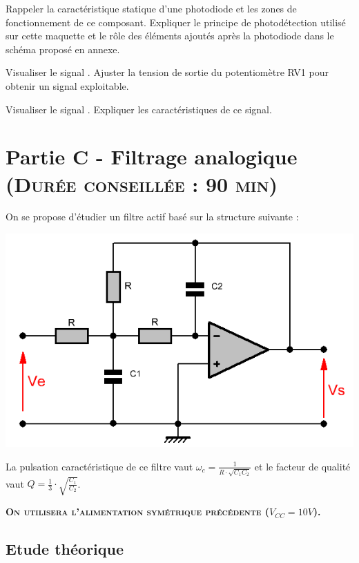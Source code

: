 \documentclass[a4paper,11pt]{article}
\begin{document}
\Real Rappeler la caractéristique statique d'une photodiode et les zones de fonctionnement de ce composant. Expliquer le principe de photodétection utilisé sur cette maquette et le rôle des éléments ajoutés après la photodiode dans le schéma proposé en annexe.

\Real Visualiser le signal . Ajuster la tension de sortie du potentiomètre RV1 pour obtenir un signal exploitable.

\Real Visualiser le signal . Expliquer les caractéristiques de ce signal.


\newpage
\section{Partie C - Filtrage analogique \textsc{\normalsize(Durée conseillée : 90 min)}}

On se propose d'étudier un filtre actif basé sur la structure suivante :

\begin{center}
\includegraphics[scale=0.75]{images/rauch.png}
\end{center}

La pulsation caractéristique de ce filtre vaut $\omega_c = \frac{1}{R \cdot \sqrt{C_1 C_2}}$ et le facteur de qualité vaut $Q = \frac{1}{3} \cdot \sqrt{\frac{C_1}{C_2}}$.


\textbf{\textsc{On utilisera l'alimentation symétrique précédente ($V_{CC} = 10V$).}}	



\subsection*{Etude théorique}
\end{document}
